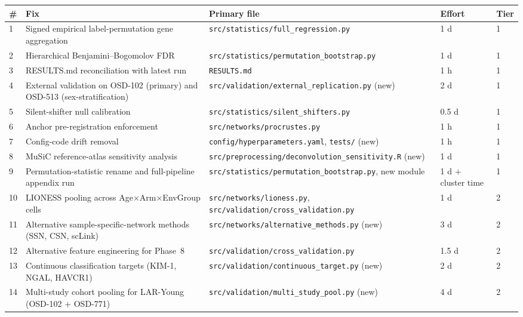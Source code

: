 \documentclass[11pt]{article}
\newcommand{\code}[1]{\texttt{#1}}
\begin{document}
\begin{center}
\small
\begin{longtable}{p{}p{}p{}p{}p{}}
\toprule
\textbf{\#} & \textbf{Fix} & \textbf{Primary file} & \textbf{Effort} & \textbf{Tier} \\
\midrule
\endhead

1  & Signed empirical label-permutation gene aggregation           & \code{src/statistics/full\_regression.py}    & 1 d & 1 \\
2  & Hierarchical Benjamini--Bogomolov FDR                        & \code{src/statistics/permutation\_bootstrap.py} & 1 d   & 1 \\
3  & RESULTS.md reconciliation with latest run                    & \code{RESULTS.md}                            & 1 h   & 1 \\
4  & External validation on OSD-102 (primary) and OSD-513 (sex-stratification) & \code{src/validation/external\_replication.py} (new) & 2 d   & 1 \\
5  & Silent-shifter null calibration                              & \code{src/statistics/silent\_shifters.py}    & 0.5 d & 1 \\
6  & Anchor pre-registration enforcement                          & \code{src/networks/procrustes.py}            & 1 h   & 1 \\
7  & Config-code drift removal                                    & \code{config/hyperparameters.yaml}, \code{tests/} (new) & 1 h   & 1 \\
8  & MuSiC reference-atlas sensitivity analysis                   & \code{src/preprocessing/deconvolution\_sensitivity.R} (new) & 1 d   & 1 \\
9  & Permutation-statistic rename and full-pipeline appendix run  & \code{src/statistics/permutation\_bootstrap.py}, new module & 1 d $+$ cluster time & 1 \\
\midrule
10 & LIONESS pooling across Age$\times$Arm$\times$EnvGroup cells  & \code{src/networks/lioness.py}, \code{src/validation/cross\_validation.py} & 1 d & 2 \\
11 & Alternative sample-specific-network methods (SSN, CSN, scLink) & \code{src/networks/alternative\_methods.py} (new) & 3 d & 2 \\
12 & Alternative feature engineering for Phase~8                  & \code{src/validation/cross\_validation.py}   & 1.5 d & 2 \\
13 & Continuous classification targets (KIM-1, NGAL, HAVCR1)      & \code{src/validation/continuous\_target.py} (new) & 2 d   & 2 \\
14 & Multi-study cohort pooling for LAR-Young (OSD-102 $+$ OSD-771) & \code{src/validation/multi\_study\_pool.py} (new) & 4 d   & 2 \\
\bottomrule
\end{longtable}
\end{center}
\end{document}
